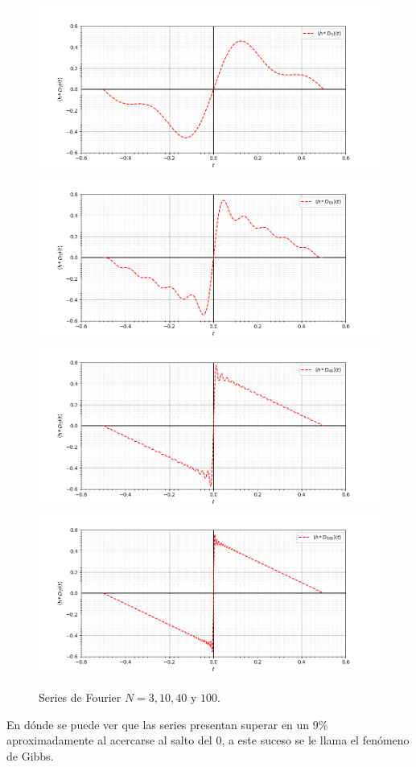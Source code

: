 \begin{figure}[H]
\begin{center}
  \includegraphics[scale=0.31]{Figures/3-serie.png}
  \includegraphics[scale=0.31]{Figures/10-serie.png}\\
  \includegraphics[scale=0.31]{Figures/40-serie.png}
  \includegraphics[scale=0.31]{Figures/100-serie.png}
\end{center}
  \caption{Series de Fourier $N=3,10,40$ y $100$.}
\label{fig:series-de-fourier-h}
\end{figure}
En dónde se puede ver que las series presentan superar en un $9\%$ aproximadamente al acercarse al salto del $0$, a este suceso se le llama el fenómeno de Gibbs. 


